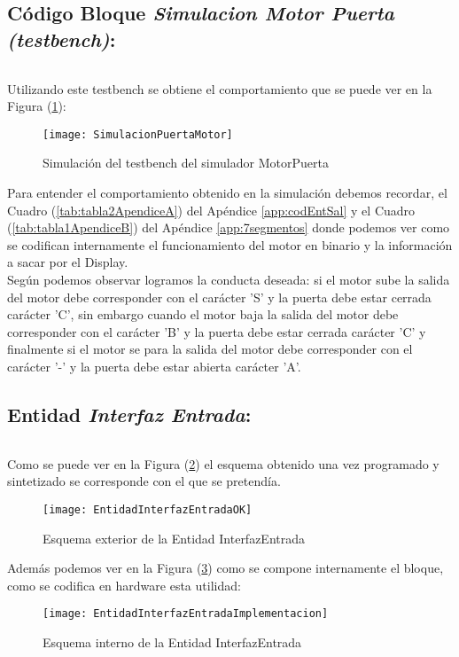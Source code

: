 \subsection{Código Bloque \textit{Simulacion Motor Puerta (testbench)}:} \label{code:MotorPuerta_tb}
	\inputminted[frame=lines,fontsize=\footnotesize,linenos]{vhdl}{CodeFiles/MotorPuerta_tb.vhd}

    Utilizando este testbench se obtiene el comportamiento que se puede ver en la Figura (\ref{fig:SimulacionMotorPuerta}):

    \begin{figure}[H]
		    \centering
		    \texttt{[image: SimulacionPuertaMotor]}
		    \caption{Simulación del testbench del simulador MotorPuerta}
		    \label{fig:SimulacionMotorPuerta}
	\end{figure}

	Para entender el comportamiento obtenido en la simulación debemos recordar, el Cuadro (\ref{tab:tabla2ApendiceA}) del Apéndice \ref{app:codEntSal} y el Cuadro (\ref{tab:tabla1ApendiceB}) del Apéndice \ref{app:7segmentos} donde podemos ver como se codifican internamente el funcionamiento del motor en binario y la información a sacar por el Display. \\
	
	Según podemos observar logramos la conducta deseada: si el motor sube la salida del motor debe corresponder con el carácter 'S' y la puerta debe estar cerrada carácter 'C', sin embargo cuando el motor baja la salida del motor debe corresponder con el carácter 'B' y la puerta debe estar cerrada carácter 'C' y finalmente si el motor se para la salida del motor debe corresponder con el carácter '-' y la puerta debe estar abierta carácter 'A'.

\subsection{Entidad \textit{Interfaz Entrada}:} \label{code:InterfazEntrada}
	\inputminted[frame=lines,fontsize=\footnotesize,linenos]{vhdl}{CodeFiles/EntidadInterfazEntrada.vhd}

	Como se puede ver en la Figura (\ref{fig:EntidadInterfazEntradaOK}) el esquema obtenido una vez programado y sintetizado se corresponde con el que se pretendía.
    \begin{figure}[H]
		    \centering
		    \texttt{[image: EntidadInterfazEntradaOK]}
		    \caption{Esquema exterior de la Entidad InterfazEntrada}
		    \label{fig:EntidadInterfazEntradaOK}
	\end{figure}
    Además podemos ver en la Figura (\ref{fig:EntidadInterfazEntradaImplementacion}) como se compone internamente el bloque, como se codifica en hardware esta utilidad:
    \begin{figure}[H]
		    \centering
		    \texttt{[image: EntidadInterfazEntradaImplementacion]}
		    \caption{Esquema interno de la Entidad InterfazEntrada}
		    \label{fig:EntidadInterfazEntradaImplementacion}
	\end{figure}


